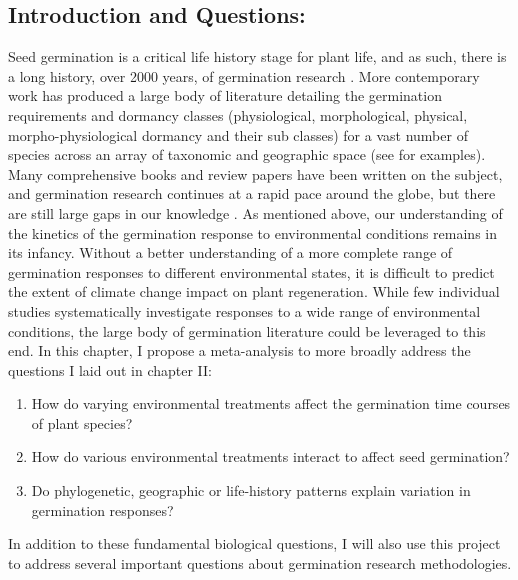 \documentclass[12pt]{article}\usepackage[]{graphicx}\usepackage[]{color}
\begin{document}
\subsection*{Introduction and Questions:}
\indent\indent Seed germination is a critical life history stage for plant life, and as such, there is a long history, over 2000 years, of germination research \citep{Baskin2014, Fenner2000}. More contemporary work has produced a large body of literature detailing the germination requirements and dormancy classes (physiological, morphological, physical, morpho-physiological dormancy and their sub classes) for a vast number of species across an array of taxonomic and geographic space (see \citet{Baskin2014} for examples). Many comprehensive books and review papers have been written on the subject, and germination research continues at a rapid pace around the globe, but there are still large gaps in our knowledge \citep{Baskin2014}. As mentioned above, our understanding of the kinetics of the germination response to environmental conditions remains in its infancy. Without a better understanding of a more complete range of germination responses to different environmental states, it is difficult to predict the extent of climate change impact on plant regeneration. While few individual studies systematically investigate responses to a wide range of environmental conditions, the large body of germination literature could be leveraged to this end. In this chapter, I propose a meta-analysis to more broadly address the questions I laid out in chapter II:
\begin{enumerate}
\item How do varying environmental treatments affect the germination time courses of plant species?
\item How do various environmental treatments interact to affect seed germination?
\item Do phylogenetic, geographic or life-history patterns explain variation in germination responses?
\end{enumerate}
\indent\indent In addition to these fundamental biological questions, I will also use this project to address several important questions about germination research methodologies.
\end{document}
